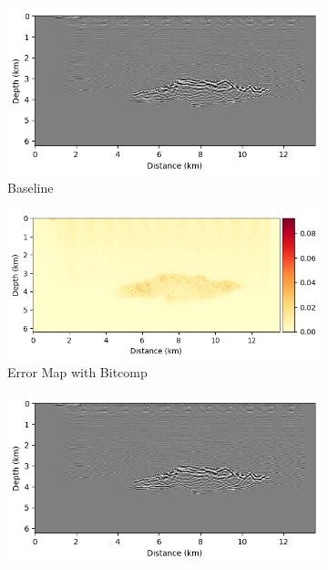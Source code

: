 \documentclass[Ingles,Final]{ic-tese-v3}
\begin{document}
\begin{figure}[]
    \centering
    \begin{subfigure}{0.49\textwidth}
        \includegraphics[width=\textwidth,trim={4px 0 0 0}, clip]{figures/quality/render_baseline_salt.png}
        \caption{Baseline}
        \label{fig:render_baseline_salt}
    \end{subfigure}
    \hfill
    \begin{subfigure}{0.49\textwidth}
        \includegraphics[width=\textwidth,trim={35px 0 8px 0px}, clip]{figures/quality/errormap_bitcomp_salt.png}
        \caption{Error Map with Bitcomp}
        \label{fig:errmap_salt}
    \end{subfigure}
    \hfill
    \begin{subfigure}{0.49\textwidth}
        \includegraphics[width=\textwidth,trim={4px 0 0 0}, clip]{figures/quality/render_cuzfp_salt.png}

\end{subfigure}
\end{figure}
\end{document}
